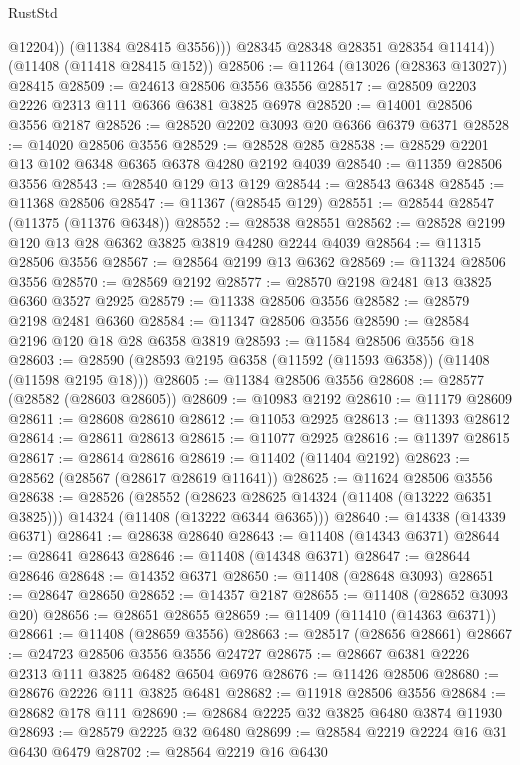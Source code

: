 \begin{lexlean}{RustStd}
\begin{coremodule}
                @12204))
            (@11384 @28415 @3556)))
        @28345
        @28348
        @28351
        @28354
        @11414))
    (@11408 (@11418 @28415 @152))
@28506 := @11264 (@13026 (@28363 @13027)) @28415
@28509 := @24613 @28506 @3556 @3556
@28517 := @28509 @2203 @2226 @2313 @111 @6366 @6381 @3825 @6978
@28520 := @14001 @28506 @3556 @2187
@28526 := @28520 @2202 @3093 @20 @6366 @6379 @6371
@28528 := @14020 @28506 @3556
@28529 := @28528 @285
@28538 := @28529 @2201 @13 @102 @6348 @6365 @6378 @4280 @2192 @4039
@28540 := @11359 @28506 @3556
@28543 := @28540 @129 @13 @129
@28544 := @28543 @6348
@28545 := @11368 @28506
@28547 := @11367 (@28545 @129)
@28551 := @28544 @28547 (@11375 (@11376 @6348))
@28552 := @28538 @28551
@28562 := @28528 @2199 @120 @13 @28 @6362 @3825 @3819 @4280 @2244 @4039
@28564 := @11315 @28506 @3556
@28567 := @28564 @2199 @13 @6362
@28569 := @11324 @28506 @3556
@28570 := @28569 @2192
@28577 := @28570 @2198 @2481 @13 @3825 @6360 @3527 @2925
@28579 := @11338 @28506 @3556
@28582 := @28579 @2198 @2481 @6360
@28584 := @11347 @28506 @3556
@28590 := @28584 @2196 @120 @18 @28 @6358 @3819
@28593 := @11584 @28506 @3556 @18
@28603 := @28590 (@28593 @2195 @6358 (@11592 (@11593 @6358)) (@11408 (@11598 @2195 @18)))
@28605 := @11384 @28506 @3556
@28608 := @28577 (@28582 (@28603 @28605))
@28609 := @10983 @2192
@28610 := @11179 @28609
@28611 := @28608 @28610
@28612 := @11053 @2925
@28613 := @11393 @28612
@28614 := @28611 @28613
@28615 := @11077 @2925
@28616 := @11397 @28615
@28617 := @28614 @28616
@28619 := @11402 (@11404 @2192)
@28623 := @28562 (@28567 (@28617 @28619 @11641))
@28625 := @11624 @28506 @3556
@28638 := @28526
    (@28552
      (@28623 @28625 @14324 (@11408 (@13222 @6351 @3825)))
      @14324
      (@11408 (@13222 @6344 @6365)))
@28640 := @14338 (@14339 @6371)
@28641 := @28638 @28640
@28643 := @11408 (@14343 @6371)
@28644 := @28641 @28643
@28646 := @11408 (@14348 @6371)
@28647 := @28644 @28646
@28648 := @14352 @6371
@28650 := @11408 (@28648 @3093)
@28651 := @28647 @28650
@28652 := @14357 @2187
@28655 := @11408 (@28652 @3093 @20)
@28656 := @28651 @28655
@28659 := @11409 (@11410 (@14363 @6371))
@28661 := @11408 (@28659 @3556)
@28663 := @28517 (@28656 @28661)
@28667 := @24723 @28506 @3556 @3556 @24727
@28675 := @28667 @6381 @2226 @2313 @111 @3825 @6482 @6504 @6976
@28676 := @11426 @28506
@28680 := @28676 @2226 @111 @3825 @6481
@28682 := @11918 @28506 @3556
@28684 := @28682 @178 @111
@28690 := @28684 @2225 @32 @3825 @6480 @3874 @11930
@28693 := @28579 @2225 @32 @6480
@28699 := @28584 @2219 @2224 @16 @31 @6430 @6479
@28702 := @28564 @2219 @16 @6430

\end{coremodule}
\end{lexlean}
